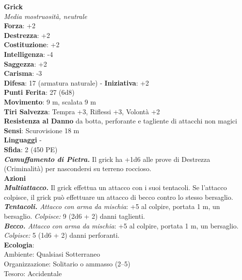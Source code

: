 \begin{multicols}{2}
\medskip\textbf{Grick}\\
\emph{Media mostruosità, neutrale}\\
\textbf{Forza}: +2\\
\textbf{Destrezza}: +2\\
\textbf{Costituzione}: +2\\
\textbf{Intelligenza}: -4\\
\textbf{Saggezza}: +2\\
\textbf{Carisma}: -3\\
\textbf{Difesa}: 17 (armatura naturale) - \textbf{Iniziativa}: +2\\
\textbf{Punti Ferita}: 27 (6d8)\\
\textbf{Movimento}: 9 m, scalata 9 m\\
\textbf{Tiri Salvezza}: Tempra +3, Riflessi +3, Volontà +2\\
\textbf{Resistenza al Danno} da botta, perforante e tagliente di attacchi non magici\\
\textbf{Sensi}: Scurovisione 18 m\\
\textbf{Linguaggi} -\\
\textbf{Sfida}: 2 (450 PE)\smallskip\\
\emph{\textbf{Camuffamento di Pietra.}} Il grick ha +1d6 alle prove di Destrezza (Criminalità) per nascondersi su terreno roccioso.\\
\smallskip\textbf{Azioni}\\
\emph{\textbf{Multiattacco.}} Il grick effettua un attacco con i suoi tentacoli. Se l'attacco colpisce, il grick può effettuare un attacco di becco contro lo stesso bersaglio.\\
\emph{\textbf{Tentacoli.} Attacco con arma da mischia}: +5 al colpire, portata 1 m, un bersaglio.
\emph{Colpisce:} 9 (2d6 + 2) danni taglienti.\\
\emph{\textbf{Becco.} Attacco con arma da mischia}: +5 al colpire, portata 1 m, un bersaglio.
\emph{Colpisce:} 5 (1d6 + 2) danni perforanti.\\
\textbf{Ecologia}: \\
Ambiente: Qualsiasi Sotterraneo\\
Organizzazione: Solitario o ammasso (2–5)\\
Tesoro: Accidentale\\


\end{multicols}
